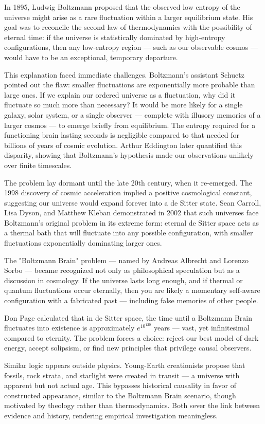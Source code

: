 \begin{historical}
In 1895, Ludwig Boltzmann proposed that the observed low entropy of the universe might arise as a rare fluctuation within a larger equilibrium state. His goal was to reconcile the second law of thermodynamics with the possibility of eternal time: if the universe is statistically dominated by high-entropy configurations, then any low-entropy region — such as our observable cosmos — would have to be an exceptional, temporary departure.

This explanation faced immediate challenges. Boltzmann's assistant Schuetz pointed out the flaw: smaller fluctuations are exponentially more probable than large ones. If we explain our ordered universe as a fluctuation, why did it fluctuate so much more than necessary? It would be more likely for a single galaxy, solar system, or a single observer — complete with illusory memories of a larger cosmos — to emerge briefly from equilibrium. The entropy required for a functioning brain lasting seconds is negligible compared to that needed for billions of years of cosmic evolution. Arthur Eddington later quantified this disparity, showing that Boltzmann's hypothesis made our observations unlikely over finite timescales.

The problem lay dormant until the late 20th century, when it re-emerged. The 1998 discovery of cosmic acceleration implied a positive cosmological constant, suggesting our universe would expand forever into a de Sitter state. Sean Carroll, Lisa Dyson, and Matthew Kleban demonstrated in 2002 that such universes face Boltzmann's original problem in its extreme form: eternal de Sitter space acts as a thermal bath that will fluctuate into any possible configuration, with smaller fluctuations exponentially dominating larger ones.

The "Boltzmann Brain" problem — named by Andreas Albrecht and Lorenzo Sorbo — became recognized not only as philosophical speculation but as a discussion in cosmology. If the universe lasts long enough, and if thermal or quantum fluctuations occur eternally, then you are likely a momentary self-aware configuration with a fabricated past — including false memories of other people. 

 Don Page calculated that in de Sitter space, the time until a Boltzmann Brain fluctuates into existence is approximately $e^{10^{120}}$ years — vast, yet infinitesimal compared to eternity. The problem forces a choice: reject our best model of dark energy, accept solipsism, or find new principles that privilege causal observers.

Similar logic appears outside physics. Young-Earth creationists propose that fossils, rock strata, and starlight were created in transit — a universe with apparent but not actual age. This bypasses historical causality in favor of constructed appearance, similar to the Boltzmann Brain scenario, though motivated by theology rather than thermodynamics. Both sever the link between evidence and history, rendering empirical investigation meaningless.
\end{historical}
